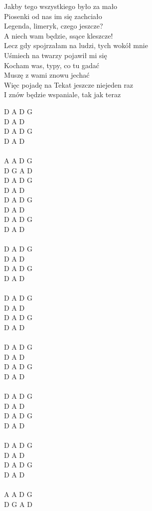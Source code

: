 \documentclass[a5paper, 10pt]{book}
\begin{document}
\begin{minipage}[t]{0.8\textwidth}
Jakby tego wszystkiego było za mało 		\\
Piosenki od nas im się zachciało	\\
Legenda, limeryk, czego jeszcze?		\\
A niech wam będzie, ssące kleszcze!\\

Lecz gdy spojrzałam na ludzi, tych wokół mnie 	\\
Uśmiech na twarzy pojawił mi się\\
Kocham was, typy, co tu gadać			\\
Muszę z wami znowu jechać	\\

\hspace*{5mm}Więc pojadę na Tekat jeszcze niejeden raz 	\\
\hspace*{5mm}I znów będzie wspaniale, tak jak teraz		\\
\end{minipage}
\begin{minipage}[t]{0.2\textwidth}
  D A D G	\\
		D A D\\
D A D G\\
		D A D\\
\\
A A D G\\
D G A D\\

D A D G\\
		D A D\\
D A D G\\
		D A D\\

D A D G\\
D A D\\
\\
D A D G\\
		D A D\\
D A D G\\
		D A D\\
\\
D A D G\\
		D A D\\
D A D G\\
		D A D\\
\\
D A D G\\
		D A D\\
D A D G\\
		D A D\\
\\
D A D G\\
		D A D\\
D A D G\\
 		D A D\\
\\
D A D G\\
		D A D\\
D A D G\\
		D A D\\
\\
A A D G\\
D G A D\\
\end{minipage}
\end{document}
